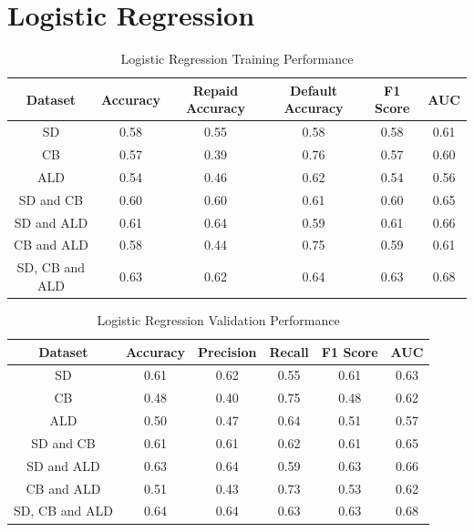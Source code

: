 
\section{Logistic Regression}

\vspace{10pt}

\begin{table}[H]
\begin{center}
\begin{tabular}{|c|c|c|c|c|c|} 
\hline
\multicolumn{1}{|c|}{Dataset}
&\multicolumn{1}{|c|}{Accuracy}
&\multicolumn{1}{|c|}{Repaid Accuracy}
&\multicolumn{1}{|c|}{Default Accuracy}
&\multicolumn{1}{|c|}{F1 Score}
&\multicolumn{1}{|c|}{AUC}\\
\hline
SD & 0.58 & 0.55 & 0.58 & 0.58 & 0.61    \\
\hline
CB & 0.57 & 0.39 & 0.76 & 0.57 & 0.60    \\
\hline
ALD & 0.54 & 0.46 & 0.62 & 0.54 & 0.56    \\
\hline
SD and CB & 0.60 & 0.60 & 0.61 & 0.60 & 0.65    \\
\hline
SD and ALD & 0.61 & 0.64 & 0.59 & 0.61 & 0.66    \\
\hline
CB and ALD & 0.58 & 0.44 & 0.75 & 0.59 & 0.61    \\
\hline
SD, CB and ALD & 0.63 & 0.62 & 0.64 & 0.63 & 0.68    \\
\hline
\end{tabular}
\end{center}
\caption{Logistic Regression Training Performance}
\label{table:lr training}
\end{table}

\vspace{10pt}

\begin{table}[H]
\begin{center}
\begin{tabular}{|c|c|c|c|c|c|} 
\hline
\multicolumn{1}{|c|}{Dataset}
&\multicolumn{1}{|c|}{Accuracy}
&\multicolumn{1}{|c|}{Precision}
&\multicolumn{1}{|c|}{Recall}
&\multicolumn{1}{|c|}{F1 Score}
&\multicolumn{1}{|c|}{AUC}\\
\hline
SD & 0.61 & 0.62 & 0.55 & 0.61 & 0.63    \\
\hline
CB & 0.48 & 0.40 & 0.75 & 0.48 & 0.62    \\
\hline
ALD & 0.50 & 0.47 & 0.64 & 0.51 & 0.57    \\
\hline
SD and CB & 0.61 & 0.61 & 0.62 & 0.61 & 0.65    \\
\hline
SD and ALD & 0.63 & 0.64 & 0.59 & 0.63 & 0.66    \\
\hline
CB and ALD & 0.51 & 0.43 & 0.73 & 0.53 & 0.62    \\
\hline
SD, CB and ALD & 0.64 & 0.64 & 0.63 & 0.63 & 0.68    \\
\hline
\end{tabular}
\end{center}
\caption{Logistic Regression Validation Performance}
\label{table:lr test}
\end{table}

